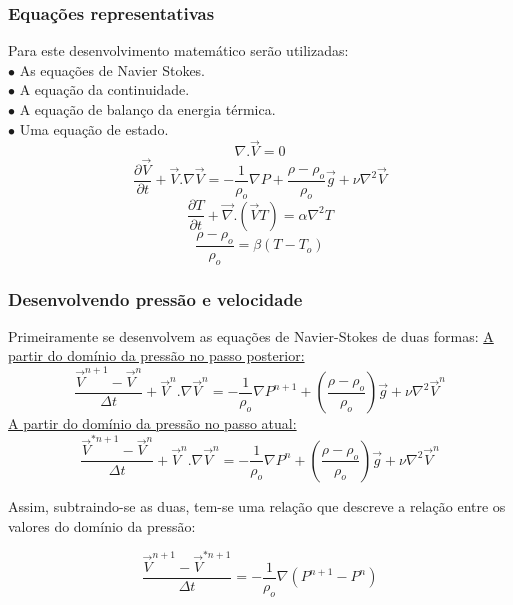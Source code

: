 \documentclass[xcolor=dvipsnames,10pt,aspectratio=169]{beamer}
\begin{document}
	\begin{frame}
		\frametitle{Equações representativas}
		\flushleft
		Para este desenvolvimento matemático serão utilizadas:\\
		\quad $\bullet$ As equações de Navier Stokes.\\
		\quad $\bullet$ A equação da continuidade.\\
		\quad $\bullet$ A equação de balanço da energia térmica.\\
		\quad $\bullet$ Uma equação de estado.\\
		
		\begin{equation}
		\nabla . \vec{V} = 0
		\end{equation}
		\begin{equation}
		\frac{\partial \vec{V}}{\partial t} +  \vec{V} . {\nabla} \vec{V}  =  -\frac{1}{\rho_o} {\nabla}P + \frac{\rho - \rho_o}{\rho_o} \vec{g} + \nu \nabla ^2 \vec{V}
		\end{equation}
		\begin{equation}
		\frac{\partial T}{\partial t} + \vec{\nabla} . \left( \vec{V}T \right) = \alpha \nabla^2T
		\end{equation}
		\begin{equation}
		\frac{\rho - \rho_o}{\rho_o} = \beta \left( T - T_o\right)
		\end{equation}
	
	\end{frame}




	
	\begin{frame}
		\frametitle{Desenvolvendo pressão e velocidade}
		\flushleft
		Primeiramente se desenvolvem as equações de Navier-Stokes de duas formas:\vspace{0.5cm}
		\centering
		\underline{A partir do domínio da pressão no passo posterior:}
		\begin{equation}
		\frac{\vec{V}^{n + 1} - \vec{V}^{n}}{\Delta t} + \vec{V}^{n} . {\nabla} \vec{V}^{n} = - \frac{1}{\rho_o}\nabla P^{n + 1} + \left( \frac{\rho - \rho_o}{\rho_o} \right) \vec{g} + \nu \nabla^2 \vec{V}^{n}
		\end{equation}\label{equation1}
		\underline{A partir do domínio da pressão no passo atual:}
		\begin{equation}
		\frac{\vec{V}^{\ast{n + 1}} - \vec{V}^{n}}{\Delta t} + \vec{V}^{n} . {\nabla} \vec{V}^{n} = - \frac{1}{\rho_o}\nabla P^{n} + \left( \frac{\rho - \rho_o}{\rho_o} \right) \vec{g} + \nu \nabla^2 \vec{V}^{n}
		\end{equation}
		
		Assim, subtraindo-se as duas, tem-se uma relação que descreve a relação entre os valores do domínio da pressão:
		
		\begin{equation}
		\frac{\vec{V}^{{n + 1}} - \vec{V}^{{\ast n+1} }}{\Delta t} = - \frac{1}{\rho_o}\nabla \left( P^{n+1} - P ^n\right)
		\end{equation}
		
		
		
	\end{frame}
\end{document}
